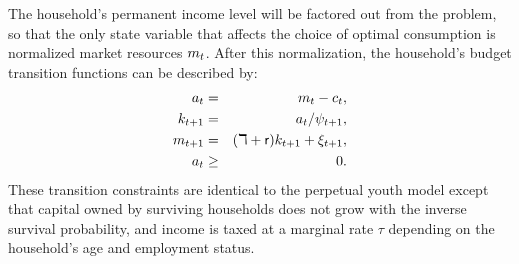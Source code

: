 \documentclass[12pt,titlepage]{econtex}
\begin{document}
The household's permanent income level will be factored out from the problem, so that the only state variable that affects the choice of optimal consumption is normalized market resources $m_t$.  After this normalization, the household's budget transition functions can be described by:
\begin{eqnarray}
  \label{LifeCycleConstraint1}
  a_t &=& m_t - c_t,\\
  \label{LifeCycleConstraint2}
  k_{t+1} &=& a_t/\psi_{t+1},\\
  \label{LifeCycleConstraint3}
  m_{t+1} &=& (\daleth +\mathsf{r}) k_{t+1} + \xi_{t+1},\\
  \label{LifeCycleConstraint4}
  a_t &\geq& 0.
\end{eqnarray}
These transition constraints are identical to the perpetual youth model except that capital owned by surviving households does not grow with the inverse survival probability, and income is taxed at a marginal rate $\tau$ depending on the household's age and employment status.
\end{document}
